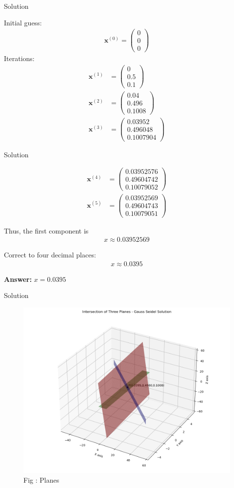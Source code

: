 \documentclass{beamer}
\numberwithin{equation}{section}
\theoremstyle{remark}
\newcommand{\myvec}[1]{\ensuremath{\begin{pmatrix}#1\end{pmatrix}}}
\let\vec\mathbf
\begin{document}
\begin{frame}{Solution}

Initial guess:
\begin{align}
\vec{x}^{(0)} = \myvec{0\\0\\0}
\end{align}
Iterations:
\begin{align}
\vec{x}^{(1)} &= \myvec{0\\0.5\\0.1} \\
\vec{x}^{(2)} &= \myvec{0.04\\0.496\\0.1008}\\
\vec{x}^{(3)} &= \myvec{0.03952\\0.496048\\0.1007904}
\end{align} 

\end{frame}

\begin{frame}{Solution}

\begin{align}
\vec{x}^{(4)} &= \myvec{0.03952576\\0.49604742\\0.10079052} \\
\vec{x}^{(5)} &= \myvec{0.03952569\\0.49604743\\0.10079051}
\end{align}

Thus, the first component is
\begin{align}
x \approx 0.03952569
\end{align}

Correct to four decimal places:
\begin{align}
x \approx 0.0395
\end{align}

\textbf{Answer:} \(x = 0.0395\)

\end{frame}

\begin{frame}{Solution}

\begin{figure}[h!]
  \centering
  \includegraphics[width=0.8\columnwidth]{figs/solution_gauss_seidel.png} 
   \caption*{Fig : Planes}
  \label{Fig1}
\end{figure}

\end{frame}
\end{document}

